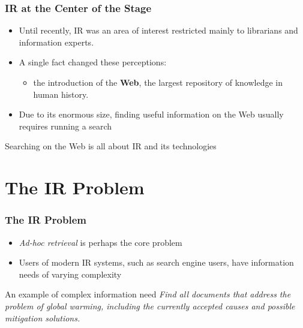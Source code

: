 \documentclass[svgnames]{beamer}
\begin{document}
\begin{frame}
    \frametitle{IR at the Center of the Stage}

    \begin{itemize}
    \item Until recently, IR was an area of interest restricted mainly to
        librarians and information experts. 
    \item A single fact changed these perceptions:
        \begin{itemize}
        \item the introduction of the \textbf{Web}, the largest repository of
            knowledge in human history.
        \end{itemize}
    \item Due to its enormous size, finding useful information on the Web
        usually requires \alert{running a search}
    \end{itemize}

    \begin{block}{}
        \centering Searching on the Web is all about IR and its technologies
    \end{block}

\end{frame}



\section{The IR Problem}


\begin{frame}
    \frametitle{The IR Problem}
    \begin{itemize}
    \item \emph{Ad-hoc retrieval} is perhaps the core problem
    \item Users of modern IR systems, such as search engine users, have
        information needs of varying complexity
    \end{itemize}
    \begin{block}{An example of complex information need}
        {\it Find all documents that address the problem of global warming,
          including the currently accepted causes and possible mitigation
          solutions.}
    \end{block}

\end{frame}
\end{document}
